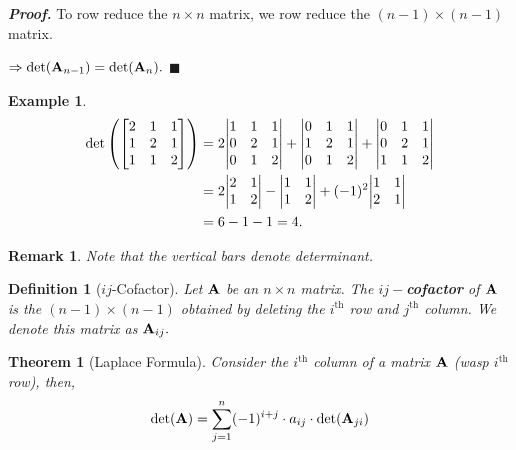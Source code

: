 \documentclass[12pt, a4paper]{article}
\newtheorem{thm}{Theorem}[subsection]
\newtheorem{df}{Definition}[subsection]
\newtheorem{eg}{Example}[subsection]
\newtheorem*{rmk}{\indent Remark}
\newenvironment*{prf}{\par\indent\textbf{\textit{Proof. }}}{\hfill $\blacksquare$\par}
\def\matrixA{\vb{A}}
\begin{document}
\begin{prf}
	To row reduce the $n\times n$ matrix, we row reduce the $(n-1)\times(n-1)$ matrix.\par $\Rightarrow\det(\matrixA_{n-1})=\det(\matrixA_n).$	
\end{prf}
\begin{eg}
	\[\begin{aligned}\det\qty(\mqty[{2&1&1\\1&2&1\\1&1&2}])&=2\mqty|{1&1&1\\0&2&1\\0&1&2}|+\mqty|0&1&1\\1&2&1\\0&1&2|+\mqty|0&1&1\\0&2&1\\1&1&2|\\&=2\mqty|2&1\\1&2|-\mqty|1&1\\1&2|+(-1)^2\mqty|1&1\\2&1|\\&=6-1-1=4.\end{aligned}\]	
\end{eg}
\begin{rmk}
	Note that the vertical bars denote determinant.
\end{rmk}
\begin{df}[$ij$-Cofactor]
	Let $\matrixA$ be an $n\times n$ matrix. The \textbf{$ij-$cofactor} of $\matrixA$ is the $(n-1)\times(n-1)$ obtained by deleting the $i^\text{th}$ row and $j^\text{th}$ column. We denote this matrix as $\matrixA_{ij}.$
\end{df}
\begin{thm}[Laplace Formula]
	Consider the $i^\text{th}$ column of a matrix $\matrixA$ (wasp $i^\text{th}$ row), then, \[\det(\matrixA)=\sum_{j=1}^n(-1)^{i+j}\cdot a_{ij}\cdot\det(\matrixA_{ji})\]	
\end{thm}
\end{document}
